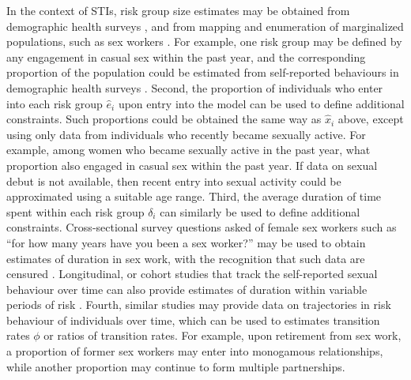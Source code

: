In the context of STIs, risk group size estimates may be obtained from
demographic health surveys \citep{DHS}, and from
mapping and enumeration of marginalized populations,
such as sex workers \citep{Abdul-Quader2014}.
For example, one risk group may be defined by
any engagement in casual sex within the past year,
and the corresponding proportion of the population
could be estimated from self-reported behaviours
in demographic health surveys \citep{DHS}.
Second, the proportion of individuals who enter into each risk group $\hat{e}_i$
upon entry into the model can be used to define additional constraints.
Such proportions could be obtained the same way as $\hat{x}_i$ above,
except using only data from individuals who recently became sexually active.
For example, among women who became sexually active in the past year,
what proportion also engaged in casual sex within the past year.
If data on sexual debut is not available,
then recent entry into sexual activity could be approximated using
a suitable age range.
Third, the average duration of time spent within each risk group $\delta_i$
can similarly be used to define additional constraints.
Cross-sectional survey questions asked of female sex workers such as	
``for how many years have you been a sex worker?''
may be used to obtain estimates of duration in sex work,
with the recognition that such data are censured \citep{Watts2010}.
Longitudinal, or cohort studies
that track the self-reported sexual behaviour over time can also provide 
estimates of duration within variable periods of risk \citep{Fergus2007}.
Fourth, similar studies may provide data on
trajectories in risk behaviour of individuals over time,
which can be used to estimates transition rates $\phi$ or ratios of transition rates.
For example, upon retirement from sex work,
a proportion of former sex workers may enter into monogamous relationships,
while another proportion may continue to form multiple partnerships.
